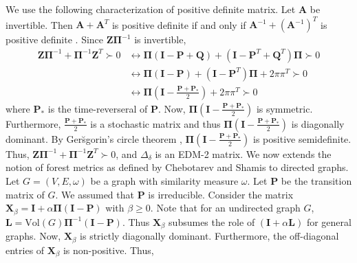 We use the following characterization of positive definite matrix. Let
$\mathbf{A}$ be invertible. Then $\mathbf{A} + \mathbf{A}^{T}$ is
positive definite if and only if $\mathbf{A}^{-1} +
(\mathbf{A}^{-1})^{T}$ is positive definite
\cite{horn94:_topic_in_matrix_analy}. Since $\mathbf{Z}\bm{\Pi}^{-1}$
is invertible,
  \begin{equation}
    \label{eq:34}
    \begin{split}
    \mathbf{Z}\bm{\Pi}^{-1} + \bm{\Pi}^{-1}\mathbf{Z}^{T} \succ 0
    & \leftrightarrow \bm{\Pi}(\mathbf{I} - \mathbf{P} + \mathbf{Q}) + (\mathbf{I} -
    \mathbf{P}^{T} + \mathbf{Q}^{T})\bm{\Pi} \succ 0 \\
    & \leftrightarrow \bm{\Pi}(\mathbf{I} - \mathbf{P}) + (\mathbf{I} -
    \mathbf{P}^{T})\bm{\Pi} + 2 \pi \pi^{T} \succ 0 \\
    & \leftrightarrow \bm{\Pi}(\mathbf{I} - \frac{\mathbf{P} + \mathbf{P}_{*}}{2})
    + 2 \pi \pi^{T} \succ 0
  \end{split}      
  \end{equation}
  where $\mathbf{P}_{*}$ is the time-reverseral of $\mathbf{P}$. Now,
  $\bm{\Pi}(\mathbf{I} - \frac{\mathbf{P} + \mathbf{P}_{*}}{2})$ is
  symmetric. Furthermore, $\frac{\mathbf{P} + \mathbf{P}_{*}}{2}$ is a
  stochastic matrix and thus $\bm{\Pi}(\mathbf{I} - \frac{\mathbf{P} +
    \mathbf{P}_{*}}{2})$ is diagonally dominant. By Ger\u{s}gorin's
  circle theorem \cite{gersgorin31:_uber_abgren_eigen_matrix},
  $\bm{\Pi}(\mathbf{I} - \frac{\mathbf{P} + \mathbf{P}_{*}}{2})$ is
  positive semidefinite. Thus, $\mathbf{Z}\bm{\Pi}^{-1} +
  \bm{\Pi}^{-1}\mathbf{Z}^{T} \succ 0$, and $\Delta_{\delta}$ is an
  EDM-2 matrix.
We now extends the notion of forest metrics as defined by Chebotarev
and Shamis to directed graphs. Let $G = (V,E,\omega)$ be a graph with
similarity measure $\omega$. Let $\mathbf{P}$ be the transition matrix
of $G$. We assumed that $\mathbf{P}$ is irreducible. Consider the
matrix $\mathbf{X}_{\beta} = \mathbf{I} + \alpha \bm{\Pi}(\mathbf{I} -
\mathbf{P})$ with $\beta \geq 0$. Note that for an undirected graph
$G$, $\mathbf{L} = \mathrm{Vol}(G) \bm{\Pi}^{-1}(\mathbf{I} -
\mathbf{P})$. Thus $\mathbf{X}_{\beta}$ subsumes the role of
$(\mathbf{I} + \alpha \mathbf{L})$ for general graphs.
%
%
\noindent Now, $\mathbf{X}_{\beta}$ is strictly diagonally dominant. Furthermore, the
off-diagonal entries of $\mathbf{X}_{\beta}$ is non-positive. Thus,
